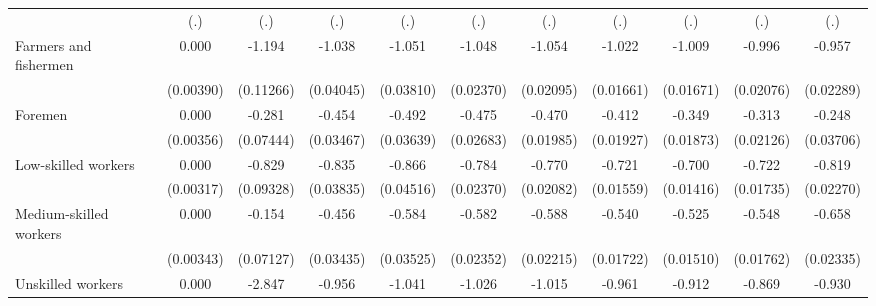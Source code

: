 {\begin{tabular}{l*{10}{c}}
                    &         (.)         &         (.)         &         (.)         &         (.)         &         (.)         &         (.)         &         (.)         &         (.)         &         (.)         &         (.)         \\
Farmers and fishermen&       0.000         &      -1.194\sym{***}&      -1.038\sym{***}&      -1.051\sym{***}&      -1.048\sym{***}&      -1.054\sym{***}&      -1.022\sym{***}&      -1.009\sym{***}&      -0.996\sym{***}&      -0.957\sym{***}\\
                    &   (0.00390)         &   (0.11266)         &   (0.04045)         &   (0.03810)         &   (0.02370)         &   (0.02095)         &   (0.01661)         &   (0.01671)         &   (0.02076)         &   (0.02289)         \\
Foremen             &       0.000         &      -0.281\sym{***}&      -0.454\sym{***}&      -0.492\sym{***}&      -0.475\sym{***}&      -0.470\sym{***}&      -0.412\sym{***}&      -0.349\sym{***}&      -0.313\sym{***}&      -0.248\sym{***}\\
                    &   (0.00356)         &   (0.07444)         &   (0.03467)         &   (0.03639)         &   (0.02683)         &   (0.01985)         &   (0.01927)         &   (0.01873)         &   (0.02126)         &   (0.03706)         \\
Low-skilled workers &       0.000         &      -0.829\sym{***}&      -0.835\sym{***}&      -0.866\sym{***}&      -0.784\sym{***}&      -0.770\sym{***}&      -0.721\sym{***}&      -0.700\sym{***}&      -0.722\sym{***}&      -0.819\sym{***}\\
                    &   (0.00317)         &   (0.09328)         &   (0.03835)         &   (0.04516)         &   (0.02370)         &   (0.02082)         &   (0.01559)         &   (0.01416)         &   (0.01735)         &   (0.02270)         \\
Medium-skilled workers&       0.000         &      -0.154\sym{*}  &      -0.456\sym{***}&      -0.584\sym{***}&      -0.582\sym{***}&      -0.588\sym{***}&      -0.540\sym{***}&      -0.525\sym{***}&      -0.548\sym{***}&      -0.658\sym{***}\\
                    &   (0.00343)         &   (0.07127)         &   (0.03435)         &   (0.03525)         &   (0.02352)         &   (0.02215)         &   (0.01722)         &   (0.01510)         &   (0.01762)         &   (0.02335)         \\
Unskilled workers   &       0.000         &      -2.847\sym{***}&      -0.956\sym{***}&      -1.041\sym{***}&      -1.026\sym{***}&      -1.015\sym{***}&      -0.961\sym{***}&      -0.912\sym{***}&      -0.869\sym{***}&      -0.930\sym{***}\\

\end{tabular}}
